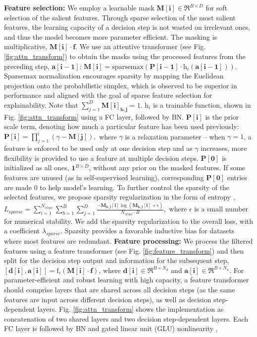 {\bf Feature selection:} We employ a learnable mask $\mathbf{M[i]} \in \Re ^ {B \times D}$ for soft selection of the salient features. Through sparse selection of the most salient features, the learning capacity of a decision step is not wasted on irrelevant ones, and thus the model becomes more parameter efficient. The masking is multiplicative, $\mathbf{M[i]} \cdot \mathbf{f}$. We use an attentive transformer (see Fig. \ref{fig:attn_transform}) to obtain the masks using the processed features from the preceding step, $\mathbf{a[i-1]}$:
$
\mathbf{M[i]} = \text{sparsemax}(\mathbf{P[i-1]} \cdot \text{h}_i(\mathbf{a[i-1]})).
$
Sparsemax normalization \citep{sparsemax} encourages sparsity by mapping the Euclidean projection onto the probabilistic simplex, which is observed to be superior in performance and aligned with the goal of sparse feature selection for explainability. Note that $\sum\nolimits_{j=1}^{D} \mathbf{M[i]_{b,j}} = 1$. $\text{h}_i$ is a trainable function, shown in Fig. \ref{fig:attn_transform} using a FC layer, followed by BN. $\mathbf{P[i]}$ is the prior scale term, denoting how much a particular feature has been used previously: $
\mathbf{P[i]} = \prod\nolimits_{j=1}^{i} (\gamma - \mathbf{M[j]}), 
$
where $\gamma$ is a relaxation parameter -- when $\gamma=1$, a feature is enforced to be used only at one decision step and as $\gamma$ increases, more flexibility is provided to use a feature at multiple decision steps. $\mathbf{P[0]}$ is initialized as all ones, $\mathbf{1} ^ {B \times D}$, without any prior on the masked features. If some features are unused (as in self-supervised learning), corresponding $\mathbf{P[0]}$ entries are made 0 to help model's learning. To further control the sparsity of the selected features, we propose sparsity regularization in the form of entropy  \citep{entropy_ssl}, $L_{sparse} = \sum\nolimits_{i=1}^{N_{steps}} \sum\nolimits_{b=1}^{B} \sum\nolimits_{j=1}^{D} \frac{-\mathbf{M_{b,j}[i]} \log(\mathbf{M_{b,j}[i]} \! +\!  \epsilon)}{N_{steps} \cdot B},$ where $\epsilon$ is a small number for numerical stability. We add the sparsity regularization to the overall loss, with a coefficient $\lambda_{sparse}$. Sparsity provides a favorable inductive bias for datasets where most features are redundant.
{\bf Feature processing:} We process the filtered features using a feature transformer (see Fig. \ref{fig:feature_transform}) and then split for the decision step output and information for the subsequent step,
$[\mathbf{d[i]}, \mathbf{a[i]}] = \text{f}_i(\mathbf{M[i]} \cdot \mathbf{f})$,
where $\mathbf{d[i]} \in \Re ^ {B \times N_d}$ and $\mathbf{a[i]} \in \Re ^ {B \times N_a}$. For parameter-efficient and robust learning with high capacity, a feature transformer should comprise layers that are shared across all decision steps (as the same features are input across different decision steps), as well as decision step-dependent layers. Fig. \ref{fig:attn_transform} shows the implementation as concatenation of two shared layers and two decision step-dependent layers. Each FC layer is followed by BN and gated linear unit (GLU) nonlinearity \citep{glu},

